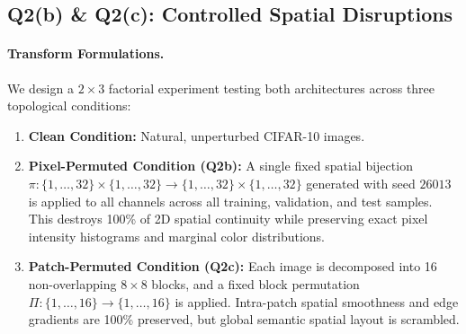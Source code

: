 \subsection{Q2(b) \& Q2(c): Controlled Spatial Disruptions}
\paragraph{Transform Formulations.}
We design a $2 \times 3$ factorial experiment testing both architectures across three topological conditions:
\begin{enumerate}
    \item \textbf{Clean Condition:} Natural, unperturbed CIFAR-10 images.
    \item \textbf{Pixel-Permuted Condition (Q2b):} A single fixed spatial bijection $\pi: \{1, \dots, 32\} \times \{1, \dots, 32\} \to \{1, \dots, 32\} \times \{1, \dots, 32\}$ generated with seed $26013$ is applied to all channels across all training, validation, and test samples. This destroys 100\% of 2D spatial continuity while preserving exact pixel intensity histograms and marginal color distributions.
    \item \textbf{Patch-Permuted Condition (Q2c):} Each image is decomposed into 16 non-overlapping $8 \times 8$ blocks, and a fixed block permutation $\Pi: \{1, \dots, 16\} \to \{1, \dots, 16\}$ is applied. Intra-patch spatial smoothness and edge gradients are 100\% preserved, but global semantic spatial layout is scrambled.
\end{enumerate}

